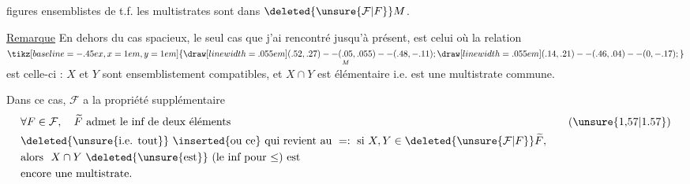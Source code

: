 figures ensemblistes de t.f. 
les multistrates sont dans $\deleted{\unsure{\mathcal F|F}}M$.

\uline{Remarque} En dehors du cas  spacieux, le
seul  cas  que j'ai rencontré
jusqu'à présent, est celui où la
relation $\underset{M}{\mathrel{\tikz[baseline=-.45ex,x=1em,y=1em]{\draw[line width=.055em] (.52,.27)--(.05,.055)--(.48,-.11); \draw[line width=.055em] (.14,.21)--(.46,.04)--(0,-.17);}}}$ est celle-ci : $X$ et $Y$
sont ensemblistement compatibles, et
$X\cap Y$ est   élémentaire i.e.
est une multistrate commune.

Dans ce cas, $\mathcal F$ a la propriété
supplémentaire 
\begingroup\makeatletter\tagsleft@true\makeatother
\[
\begin{aligned}[t]
&\forall F\in\mathcal F,\quad \widetilde F\ \text{admet le inf de deux éléments}\\
&\text{\deleted{\unsure{i.e. tout}} \inserted{ou ce} qui revient au } = :\ \text{si } X,Y\in\deleted{\unsure{\mathcal F|F}}\widetilde F,\\
&\text{alors }\ X\cap Y\ \deleted{\unsure{\text{est}}}\ (\text{le inf pour }{\leq})\ \text{est}\\
&\text{encore une multistrate.}
\end{aligned}
\tag*{(\unsure{1,57|1.57})}
\]
\endgroup

